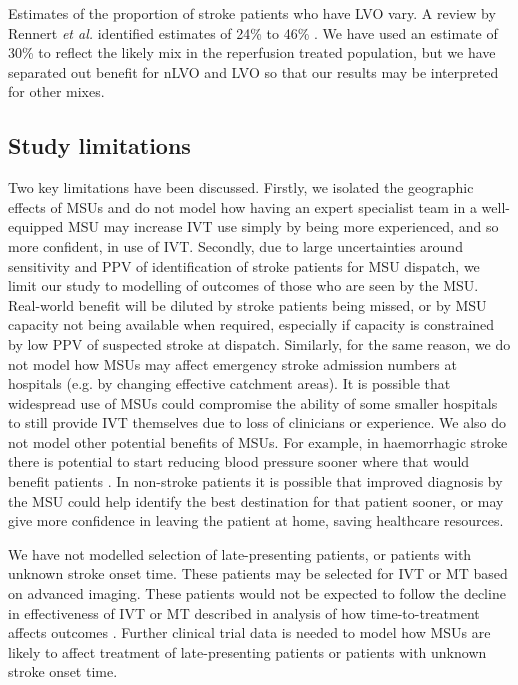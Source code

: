 Estimates of the proportion of stroke patients who have LVO vary. A review by Rennert \textit{et al.} identified estimates of 24\% to 46\% \cite{rennert_epidemiology_2019}. We have used an estimate of 30\% to reflect the likely mix in the reperfusion treated population, but we have separated out benefit for nLVO and LVO so that our results may be interpreted for other mixes.

\subsection{Study limitations}

Two key limitations have been discussed. Firstly, we isolated the geographic effects of MSUs and do not model how having an expert specialist team in a well-equipped MSU may increase IVT use simply by being more experienced, and so more confident, in use of IVT. Secondly, due to large uncertainties around sensitivity and PPV of identification of stroke patients for MSU dispatch, we limit our study to modelling of outcomes of those who are seen by the MSU. Real-world benefit will be diluted by stroke patients being missed, or by MSU capacity not being available when required, especially if capacity is constrained by low PPV of suspected stroke at dispatch. Similarly, for the same reason, we do not model how MSUs may affect emergency stroke admission numbers at hospitals (e.g. by changing effective catchment areas). It is possible that widespread use of MSUs could compromise the ability of some smaller hospitals to still provide IVT themselves due to loss of clinicians or experience. We also do not model other potential benefits of MSUs. For example, in haemorrhagic stroke there is potential to start reducing blood pressure sooner where that would benefit patients \cite{li_intensive_2024}. In non-stroke patients it is possible that improved diagnosis by the MSU could help identify the best destination for that patient sooner, or may give more confidence in leaving the patient at home, saving healthcare resources.

We have not modelled selection of late-presenting patients, or patients with unknown stroke onset time. These patients may be selected for IVT or MT based on advanced imaging. These patients would not be expected to follow the decline in effectiveness of IVT or MT described in analysis of how time-to-treatment affects outcomes \cite{emberson_effect_2014, fransen_time_2016}. Further clinical trial data is needed to model how MSUs are likely to affect treatment of late-presenting patients or patients with unknown stroke onset time.

